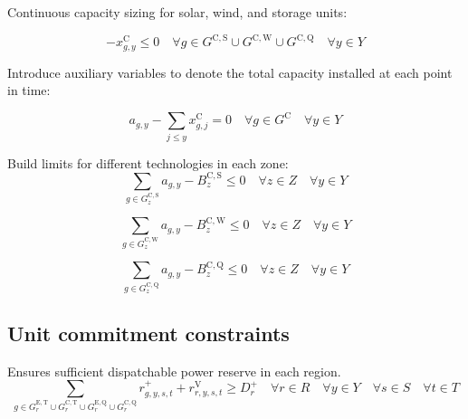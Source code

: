 \documentclass{article}
\newcommand{\sGeneratorsExistingThermal}{G^{\mathrm{E,T}}}
\newcommand{\sGeneratorsCandidate}{G^{\mathrm{C}}}
\newcommand{\sGeneratorsCandidateThermal}{G^{\mathrm{C,T}}}
\newcommand{\sGeneratorsCandidateWind}{G^{\mathrm{C,W}}}
\newcommand{\sGeneratorsCandidateSolar}{G^{\mathrm{C,S}}}
\newcommand{\sStorageExisting}{G^{\mathrm{E,Q}}}
\newcommand{\sStorageCandidate}{G^{\mathrm{C,Q}}}
\newcommand{\sYears}{Y}
\newcommand{\sScenarios}{S}
\newcommand{\sIntervals}{T}
\newcommand{\sZones}{Z}
\newcommand{\sRegions}{R}
\newcommand{\iGenerator}{g}
\newcommand{\iYear}{y}
\newcommand{\iYearAlias}{j}
\newcommand{\iScenario}{s}
\newcommand{\iInterval}{t}
\newcommand{\iZone}{z}
\newcommand{\iRegion}{r}
\newcommand{\cBuildLimitWind}{B^{\mathrm{C,\mathrm{W}}}_{\iZone}}
\newcommand{\cBuildLimitSolar}{B^{\mathrm{C,\mathrm{S}}}_{\iZone}}
\newcommand{\cBuildLimitStorage}{B^{\mathrm{C,\mathrm{Q}}}_{\iZone}}
\newcommand{\cReserveUpRequirement}[1][\iRegion]{D^{+}_{#1}}
\newcommand{\vInstalledCapacity}[1][\iGenerator,\iYear]{x^{\mathrm{C}}_{#1}}
\newcommand{\vReserveUp}[1][\iGenerator,\iYear,\iScenario,\iInterval]{r^{+}_{#1}}
\newcommand{\vReserveUpViolation}[1][\iRegion,\iYear,\iScenario,\iInterval]{r^{\mathrm{V}}_{#1}}
\newcommand{\vInstalledCapacityTotal}[1][\iGenerator,\iYear]{a_{#1}}
\begin{document}
Continuous capacity sizing for solar, wind, and storage units:

\begin{equation}
- \vInstalledCapacity[\iGenerator,\iYear] \leq 0 \quad \forall \iGenerator \in \sGeneratorsCandidateSolar \cup \sGeneratorsCandidateWind \cup \sStorageCandidate \quad \forall \iYear \in \sYears
\label{eqn: non negative investment capacity}
\end{equation}

Introduce auxiliary variables to denote the total capacity installed at each point in time:

\begin{equation}
	\vInstalledCapacityTotal - \sum\limits_{\iYearAlias \leq \iYear} \vInstalledCapacity[\iGenerator,\iYearAlias] = 0 \quad \forall \iGenerator \in \sGeneratorsCandidate \quad \forall \iYear \in \sYears
\end{equation}

Build limits for different technologies in each zone:
\begin{equation}
\sum\limits_{\iGenerator \in \sGeneratorsCandidateSolar_{\iZone}} \vInstalledCapacityTotal - \cBuildLimitSolar \leq 0 \quad \forall \iZone \in \sZones \quad \forall \iYear \in \sYears
\end{equation}

\begin{equation}
\sum\limits_{\iGenerator \in \sGeneratorsCandidateWind_{\iZone}} \vInstalledCapacityTotal - \cBuildLimitWind \leq 0 \quad \forall \iZone \in \sZones \quad \forall \iYear \in \sYears 
\end{equation}

\begin{equation}
\sum\limits_{\iGenerator \in \sStorageCandidate_{\iZone}} \vInstalledCapacityTotal - \cBuildLimitStorage \leq 0  \quad \forall \iZone \in \sZones \quad \forall \iYear \in \sYears
\label{eqn: storage build limits}
\end{equation}

\subsection{Unit commitment constraints}
Ensures sufficient dispatchable power reserve in each region.
\begin{equation}
\sum\limits_{\iGenerator \in \sGeneratorsExistingThermal_{\iRegion} \cup \sGeneratorsCandidateThermal_{\iRegion} \cup \sStorageExisting_{\iRegion} \cup \sStorageCandidate_{\iRegion}} \vReserveUp + \vReserveUpViolation \geq \cReserveUpRequirement \quad \forall \iRegion \in \sRegions \quad \forall \iYear \in \sYears \quad \forall \iScenario \in \sScenarios \quad \forall \iInterval \in \sIntervals
\label{eqn: reserve constraints}
\end{equation}
\end{document}
